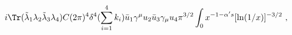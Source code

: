 \begin{equation}
i\Tr (\tilde\lambda_1 \lambda_2 \tilde\lambda_3 \lambda_4) C (2\pi)^4
\delta^4 (\sum_{i=1}^4 k_i)
\bar u_1 \gamma^\mu u_2 \bar u_3 \gamma_\mu u_4
\pi^{3/2}
\int_0 x^{-1-\alpha' s} [\ln (1/x)]^{-3/2}\ ,
\end{equation}


